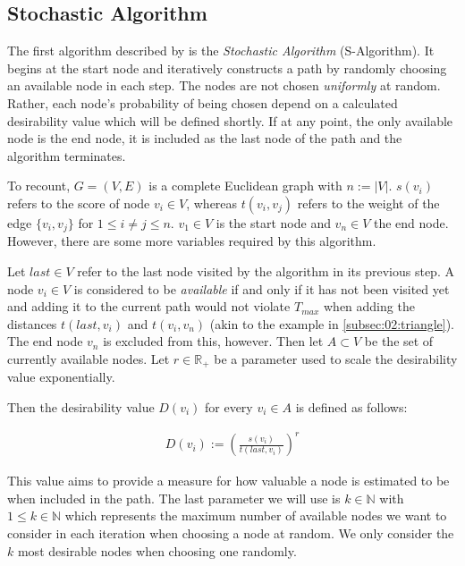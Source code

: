\subsection{Stochastic Algorithm}
\label{subsec:03:salgo}

The first algorithm described by \citeauthor{tsiligiridis_heuristic_1984} is the \emph{Stochastic Algorithm} (S-Algorithm).
It begins at the start node and iteratively constructs a path by randomly choosing an available node in each step.
The nodes are not chosen \emph{uniformly} at random. Rather, each node's probability of being chosen depend on a calculated desirability value which will be defined shortly.
If at any point, the only available node is the end node, it is included as the last node of the path and the algorithm terminates.

To recount, $G = (V, E)$ is a complete Euclidean graph with $n := |V|$.
$s(v_i)$ refers to the score of node $v_i \in V$, whereas $t(v_i,v_j)$ refers to the weight of the edge $\{v_i, v_j\}$ for $1 \leq i \neq j \leq n$.
$v_1 \in V$ is the start node and $v_n \in V$ the end node.
However, there are some more variables required by this algorithm.

Let $last \in V$ refer to the last node visited by the algorithm in its previous step.
A node $v_i \in V$ is considered to be \emph{available} if and only if it has not been visited yet and adding it to the current path would not violate $T_{max}$ when adding the distances $t(last, v_i)$ and $t(v_i, v_n)$ (akin to the example in \cref{subsec:02:triangle}).
The end node $v_n$ is excluded from this, however.
Then let $A \subset V$ be the set of currently available nodes.
Let $r \in \mathbb{R}_+$ be a parameter used to scale the desirability value exponentially.

Then the desirability value $D(v_i)$ for every $v_i \in A$ is defined as follows:

\begin{align*}
	D(v_i) := \left( \frac{s(v_i)}{t(last, v_i)} \right)^r
\end{align*}

This value aims to provide a measure for how valuable a node is estimated to be when included in the path.
The last parameter we will use is $k \in \mathbb{N}$ with $1 \leq k \in \mathbb{N}$ which represents the maximum number of available nodes we want to consider in each iteration when choosing a node at random.
We only consider the $k$ most desirable nodes when choosing one randomly.

